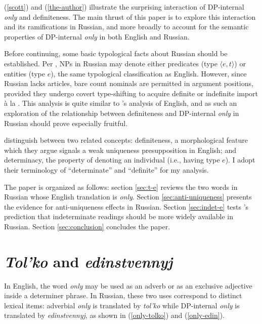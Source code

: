 \documentclass{article}
\begin{document}
(\ref{scott}) and (\ref{the-author}) illustrate the surprising interaction of DP-internal \textit{only} and definiteness. The main thrust of this paper is to explore this interaction and its ramifications in Russian, and more broadly to account for the semantic properties of DP-internal \textit{only} in both English and Russian.

Before continuing, some basic typological facts about Russian should be established. Per \citet{chierchia98}, NPs in Russian may denote either predicates (type $\langle e, t \rangle$) or entities (type $e$), the same typological classification as English. However, since Russian lacks articles, bare count nominals are permitted in argument positions, provided they undergo covert type-shifting to acquire definite or indefinite import \`{a} la \citet{partee86}. This analysis is quite similar to \citeauthor{cb2015}'s analysis of English, and as such an exploration of the relationship between definiteness and DP-internal \textit{only} in Russian should prove especially fruitful.

\citeauthor{cb2015} distinguish between two related concepts: definiteness, a morphological feature which they argue signals a weak uniqueness presupposition in English; and determinacy, the property of denoting an individual (i.e., having type $e$). I adopt their terminology of ``determinate'' and ``definite'' for my analysis.

The paper is organized as follows: section \ref{sec:t-e} reviews the two words in Russian whose English translation is \textit{only}. Section \ref{sec:anti-uniqueness} presents the evidence for anti-uniqueness effects in Russian. Section \ref{sec:indet-e} tests \citeauthor{cb2015}'s prediction that indeterminate readings should be more widely available in Russian. Section \ref{sec:conclusion} concludes the paper.



\section{\textit{Tol'ko} and \textit{edinstvennyj} \label{sec:t-e}}
In English, the word \textit{only} may be used as an adverb or as an exclusive adjective inside a determiner phrase. In Russian, these two uses correspond to distinct lexical items: adverbial \textit{only} is translated by \textit{tol'ko} while DP-internal \textit{only} is translated by \textit{edinstvennyj}, as shown in (\ref{only-tolko}) and (\ref{only-edin}).
\end{document}
